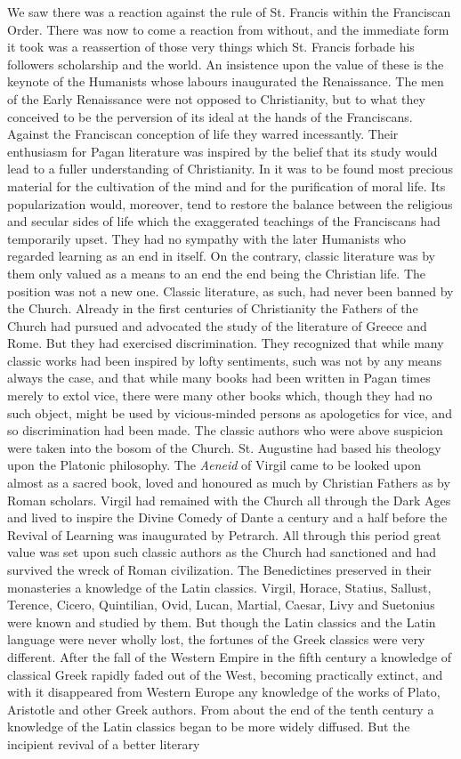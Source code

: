 \documentclass{book}
\begin{document}
We saw there was a reaction against the rule of St. Francis within the Franciscan Order. There was now to come a reaction from without, and the immediate form it took was a reassertion of those very things which St. Francis forbade his followers scholarship and the world. An insistence upon the value of these is the keynote of the Humanists whose labours inaugurated the Renaissance. The men of the Early Renaissance were not opposed to Christianity, but to what they conceived to be the perversion of its ideal at the hands of the Franciscans. Against the Franciscan conception of life they warred incessantly. Their enthusiasm for Pagan literature was inspired by the belief that its study would lead to a fuller understanding of Christianity. In it was to be found most precious material for the cultivation of the mind and for the purification of moral life. Its popularization would, moreover, tend to restore the balance between the religious and secular sides of life which the exaggerated teachings of the Franciscans had temporarily upset. They had no sympathy with the later Humanists who regarded learning as an end in itself. On the contrary, classic literature was by them only valued as a means to an end the end being the Christian life. The position was not a new one. Classic literature, as such, had never been banned by the Church. Already in the first centuries of Christianity the Fathers of the Church had pursued and advocated the study of the literature of Greece and Rome. But they had exercised discrimination. They recognized that while many classic works had been inspired by lofty sentiments, such was not by any means always the case, and that while many books had been written in Pagan times merely to extol vice, there were many other books which, though they had no such object, might be used by vicious-minded persons as apologetics for vice, and so discrimination had been made. The classic authors who were above suspicion were taken into the bosom of the Church. St. Augustine had based his theology upon the Platonic philosophy. The \emph{Aeneid} of Virgil came to be looked upon almost as a sacred book, loved and honoured as much by Christian Fathers as by Roman scholars. Virgil had remained with the Church all through the Dark Ages and lived to inspire the Divine Comedy of Dante a century and a half before the Revival of Learning was inaugurated by Petrarch. All through this period great value was set upon such classic authors as the Church had sanctioned and had survived the wreck of Roman civilization. The Benedictines preserved in their monasteries a knowledge of the Latin classics. Virgil, Horace, Statius, Sallust, Terence, Cicero, Quintilian, Ovid, Lucan, Martial, Caesar, Livy and Suetonius were known and studied by them. But though the Latin classics and the Latin language were never wholly lost, the fortunes of the Greek classics were very different. After the fall of the Western Empire in the fifth century a knowledge of classical Greek rapidly faded out of the West, becoming practically extinct, and with it disappeared from Western Europe any knowledge of the works of Plato, Aristotle and other Greek authors. From about the end of the tenth century a knowledge of the Latin classics began to be more widely diffused. But the incipient revival of a better literary 
\end{document}
